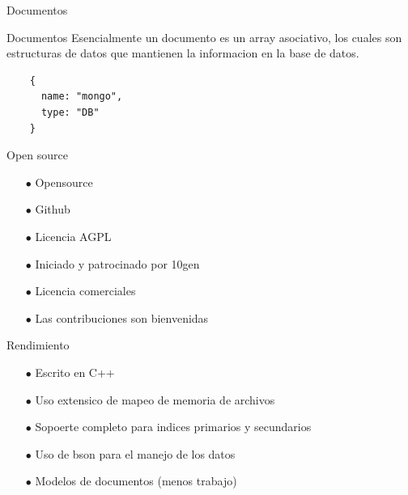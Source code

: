 \documentclass[12pt]{beamer}
\begin{document}
\begin{frame}[fragile]{Documentos}
  \begin{block}{Documentos}
    Esencialmente un documento es un array asociativo, los cuales son  estructuras de 
    datos que mantienen la informacion en la base de datos.
  \end{block}
  \vfill
  \begin{verbatim}
    {
      name: "mongo",
      type: "DB"
    }
  \end{verbatim} 
\end{frame}

\begin{frame}{Open source}
  \begin{itemize}
    \item[$\bullet$] Opensource

    \item[$\bullet$] Github

    \item[$\bullet$] Licencia AGPL

    \item[$\bullet$] Iniciado y patrocinado por 10gen

    \item[$\bullet$] Licencia comerciales

    \item[$\bullet$] Las contribuciones  son bienvenidas
  \end{itemize}
\end{frame}


\begin{frame}{Rendimiento}

  \begin{itemize}
  \item[$\bullet$] Escrito en C++

  \item[$\bullet$] Uso extensico de mapeo de memoria de archivos

  \item[$\bullet$] Sopoerte completo para indices primarios y secundarios

  \item[$\bullet$] Uso de bson para el manejo de los datos

  \item[$\bullet$] Modelos de documentos (menos trabajo)
  \end{itemize} 
\end{frame}
\end{document}
